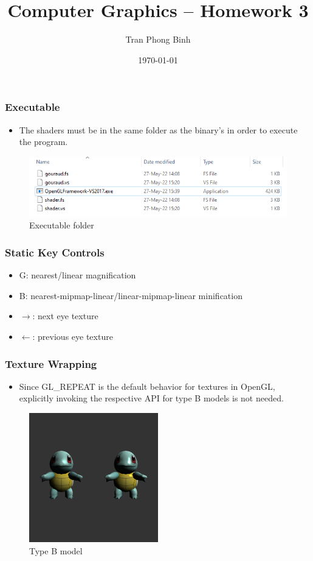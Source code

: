 \documentclass{beamer}
\title{Computer Graphics -- Homework 3}
\author{Tran Phong Binh}
\institute{Student ID: 110062421}
\date{\today}
\begin{document}
\begin{frame}
  \titlepage
\end{frame}

\begin{frame}
  \frametitle{Executable}
  \begin{itemize}
    \item The shaders must be in the same folder as the binary's in order to execute the program.
  \end{itemize}
  \begin{figure}
    \includegraphics[width=\textwidth]{executable}
    \caption{Executable folder}
  \end{figure}
\end{frame}

\begin{frame}
  \frametitle{Static Key Controls}
  \begin{itemize}
    \item G: nearest/linear magnification
    \item B: nearest-mipmap-linear/linear-mipmap-linear minification
    \item $\rightarrow$: next eye texture
    \item $\leftarrow$: previous eye texture
  \end{itemize}
\end{frame}

\begin{frame}
  \frametitle{Texture Wrapping}
  \begin{itemize}
    \item Since GL\_REPEAT is the default behavior for textures in OpenGL, explicitly invoking the respective API for type B models is not needed.
  \end{itemize}
  \begin{figure}
    \includegraphics[width=0.5\textwidth]{type_b_model}
    \caption{Type B model}
  \end{figure}
\end{frame}
\end{document}
